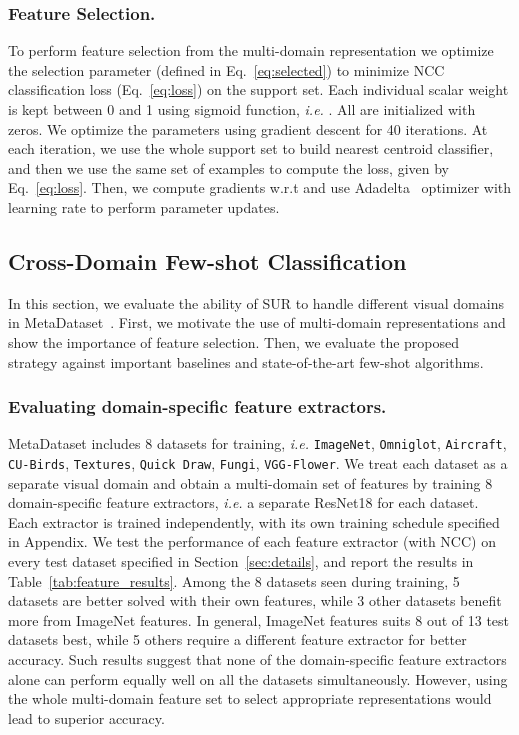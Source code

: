 \documentclass[runningheads]{llncs}
\begin{document}
\subsubsection{Feature Selection.} To perform feature selection from the
multi-domain representation we optimize the selection parameter 
(defined in Eq.~\ref{eq:selected}) to minimize NCC classification loss
(Eq.~\ref{eq:loss}) on the support set. Each individual scalar weight
 is kept between 0 and 1 using sigmoid function, \textit{i.e.} . All  are initialized with zeros. We
optimize the parameters  using gradient descent for 40
iterations. At each iteration, we use the whole support set to build nearest
centroid classifier, and then we use the same set of examples to compute the
loss, given by Eq.~\ref{eq:loss}. Then, we compute gradients w.r.t  and use Adadelta~\cite{zeiler2012adadelta} optimizer with
learning rate  to perform parameter updates.

\subsection{Cross-Domain Few-shot Classification}\label{sec:cross_domain}
In this section, we evaluate the ability of SUR to handle different visual
domains in MetaDataset~\cite{triantafillou2019meta}. First, we motivate the use
of multi-domain representations and show the importance of feature selection. Then,
we evaluate the proposed strategy against important baselines and
state-of-the-art few-shot algorithms.

\subsubsection{Evaluating domain-specific feature extractors.}
MetaDataset includes 8 datasets for training, \textit{i.e.} \texttt{ImageNet},
\texttt{Omniglot}, \texttt{Aircraft}, \texttt{CU-Birds}, \texttt{Textures},
\texttt{Quick Draw}, \texttt{Fungi}, \texttt{VGG-Flower}. We treat each dataset
as a separate visual domain and obtain a multi-domain set of features by training 8
domain-specific feature extractors, \textit{i.e.} a separate ResNet18 for each dataset.
Each extractor is trained independently, with its own
training schedule specified in Appendix. We test the performance of each feature
extractor (with NCC) on every test dataset specified in
Section~\ref{sec:details}, and report the results in
Table~\ref{tab:feature_results}. Among the 8 datasets seen during training, 5
datasets are better solved with their own features, while 3 other datasets
benefit more from ImageNet features. In general, ImageNet features suits 8
out of 13 test datasets best, while 5 others require a different feature extractor
for better accuracy.
Such results suggest that none of the domain-specific feature extractors alone
can perform equally well on all the datasets simultaneously. However, using the
whole multi-domain feature set to select appropriate representations would lead to
superior accuracy.
\end{document}

